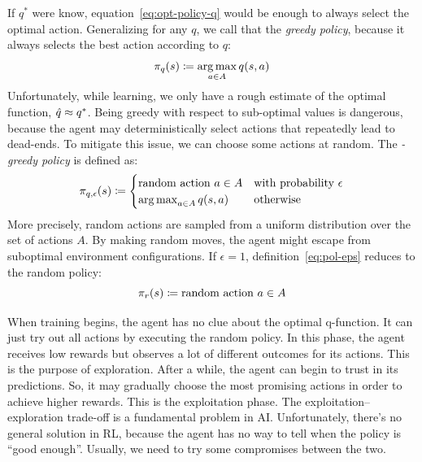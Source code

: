 If $q^*$ were know, equation~\eqref{eq:opt-policy-q} would be enough to always
select the optimal action. Generalizing for any $q$, we call that the
\emph{greedy policy}, because it always selects the best action according to
$q$:
\begin{equation}
	\pi_q(s) \coloneqq \operatorname*{arg\,max}_{a \in A} q(s, a)
	\label{eq:pol-greedy}
\end{equation}
Unfortunately, while learning, we only have a rough estimate of the optimal
function, ${\hat{q} \approx q^*}$. Being greedy with respect to sub-optimal
values is dangerous, because the agent may deterministically select
actions that repeatedly lead to dead-ends.  To mitigate this issue, we can
choose some actions at random. The \emph{\eps-greedy policy} is defined as:
\begin{equation}
	\pi_{q,\epsilon}(s) \coloneqq
	\begin{cases}
		\text{random action $a \in A$}
		&\text{with probability $\epsilon$} \\
		\operatorname*{arg\,max}_{a \in A} q(s, a)
		&\text{otherwise}
	\end{cases}
	\label{eq:pol-eps}
\end{equation}
More precisely, random actions are sampled from a uniform distribution over
the set of actions $A$. By making random moves, the agent might escape from
suboptimal environment configurations. If $\epsilon = 1$,
definition~\eqref{eq:pol-eps} reduces to the random policy:
\begin{equation}
	\pi_r(s) \coloneqq \text{random action $a \in A$}
	\label{eq:pol-random}
\end{equation}

When training begins, the agent has no clue about the optimal q-function. It
can just try out all actions by executing the random policy. In this phase,
the agent receives low rewards but observes a lot of different outcomes for
its actions. This is the purpose of exploration. After a while, the agent can
begin to trust in its predictions. So, it may gradually choose the most
promising actions in order to achieve higher rewards. This is the exploitation
phase.  The exploitation--exploration trade-off is a fundamental problem in
AI.  Unfortunately, there's no general solution in RL, because the agent has
no way to tell when the policy is ``good enough''. Usually, we need to try
some compromises between the two.

